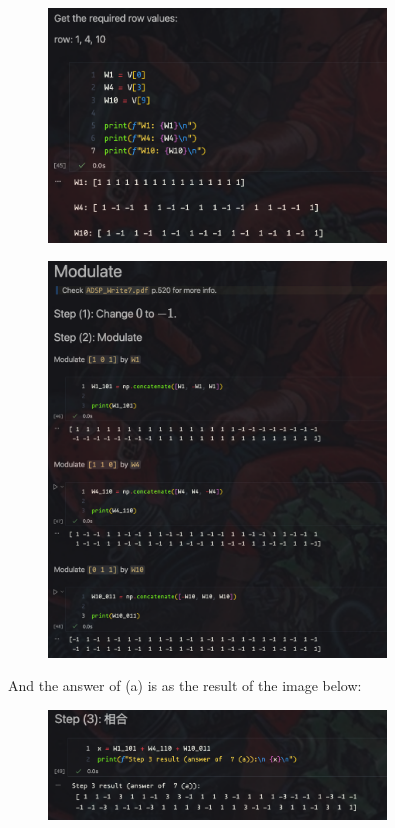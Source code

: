 \documentclass{article}
\begin{document}
\begin{figure}[H]
    \centering
    \includegraphics[width=0.8\textwidth]{HW5_img/7/get_required_row.png}
\end{figure}

\begin{figure}[H]
    \centering
    \includegraphics[width=0.8\textwidth]{HW5_img/7/modulate.png}
\end{figure}

And the answer of (a) is as the result of the image below:

\begin{figure}[H]
    \centering
    \includegraphics[width=0.8\textwidth]{HW5_img/7/result_a.png}
\end{figure}
\end{document}
